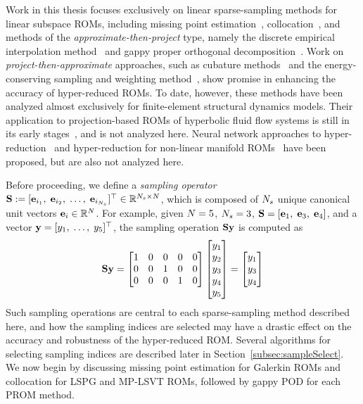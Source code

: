 Work in this thesis focuses exclusively on linear sparse-sampling methods for linear subspace ROMs, including missing point estimation~\cite{Astrid2004}, collocation~\cite{Bos2004}, and methods of the \textit{approximate-then-project} type, namely the discrete empirical interpolation method~\cite{Chaturantabut2010} and gappy proper orthogonal decomposition~\cite{Everson1995}. Work on \textit{project-then-approximate} approaches, such as cubature methods~\cite{An2008,Hernandez2017} and the energy-conserving sampling and weighting method~\cite{Farhat2014}, show promise in enhancing the accuracy of hyper-reduced ROMs. To date, however, these methods have been analyzed almost exclusively for finite-element structural dynamics models. Their application to projection-based ROMs of hyperbolic fluid flow systems is still in its early stages~\cite{Grimberg2020Hyper}, and is not analyzed here. Neural network approaches to hyper-reduction~\cite{nnHyperRed} and hyper-reduction for non-linear manifold ROMs~\cite{Kim2022} have been proposed, but are also not analyzed here.

Before proceeding, we define a \textit{sampling operator} $\mathbf{S} := [\mathbf{e}_{i_1}, \; \mathbf{e}_{i_2}, \; \hdots, \; \mathbf{e}_{i_{N_s}} ]^\top \in \mathbb{R}^{N_s \times N}$, which is composed of $N_s$ unique canonical unit vectors $\mathbf{e}_{i} \in \mathbb{R}^{N}$. For example, given $N = 5$, $N_s = 3$, $\mathbf{S} = [\mathbf{e}_1, \; \mathbf{e}_3, \; \mathbf{e}_4]$,
and a vector $\mathbf{y} = [y_1, \; \hdots, \; y_5]^\top$, the sampling operation $\mathbf{S} \mathbf{y}$ is computed as
%
\begin{equation}
	\mathbf{S} \mathbf{y} =
	\begin{bmatrix}
		1 & 0 & 0 & 0 & 0 \\
		0 & 0 & 1 & 0 & 0 \\
		0 & 0 & 0 & 1 & 0 \\
	\end{bmatrix}
	\begin{bmatrix}
		y_1 \\ y_2 \\ y_3 \\ y_4 \\ y_5
	\end{bmatrix} =
	\begin{bmatrix}
		y_1 \\ y_3 \\ y_4
	\end{bmatrix}
\end{equation}
%
Such sampling operations are central to each sparse-sampling method described here, and how the sampling indices are selected may have a drastic effect on the accuracy and robustness of the hyper-reduced ROM. Several algorithms for selecting sampling indices are described later in Section~\ref{subsec:sampleSelect}. We now begin by discussing missing point estimation for Galerkin ROMs and collocation for LSPG and MP-LSVT ROMs, followed by gappy POD for each PROM method.

